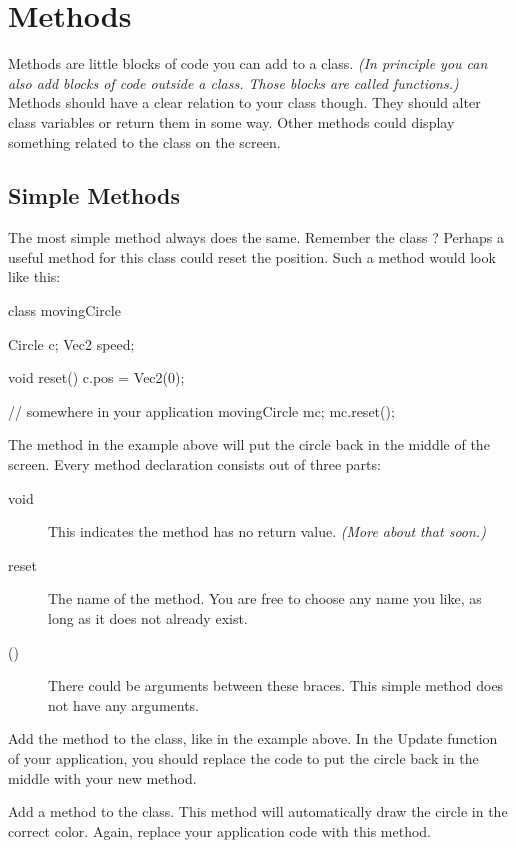 \chapter{Methods}

Methods are little blocks of code you can add to a class. \textit{(In principle you can also add blocks of code outside a class. Those blocks are called functions.)} Methods should have a clear relation to your class though. They should alter class variables or return them in some way. Other methods could display something related to the class on the screen.

\section{Simple Methods}

The most simple method always does the same. Remember the class ? Perhaps a useful method for this class could reset the position. Such a method would look like this:

\begin{code}
class movingCircle {
  Circle c;
  Vec2 speed;
  
  void reset() {
    c.pos = Vec2(0);
  }
}

// somewhere in your application
movingCircle mc;
mc.reset();
\end{code}

The method in the example above will put the circle back in the middle of the screen. Every method declaration consists out of three parts:

\begin{description}
\item[void]This indicates the method has no return value. \textit{(More about that soon.)}
\item[reset] The name of the method. You are free to choose any name you like, as long as it does not already exist.
\item[()]There could be arguments between these braces. This simple method does not have any arguments.
\end{description}

\begin{exercise}
Add the  method to the class, like in the example above. In the Update function of your application, you should replace the code to put the circle back in the middle with your new method. 

Add a  method to the class. This method will automatically draw the circle in the correct color. Again, replace your application code with this method.
\end{exercise}

